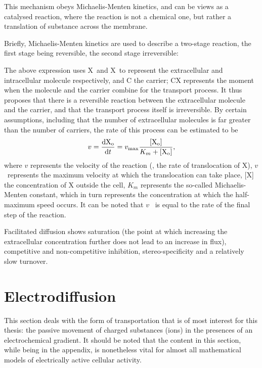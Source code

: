 \documentclass[../thesis-main.tex]{subfiles}
\begin{document}
 This mechanism obeys Michaelis-Menten kinetics, and can be views as a catalysed reaction, where the reaction is not a chemical one, but rather a translation of substance across the membrane.
 
 Briefly, Michaelis-Menten kinetics are used to describe a two-stage reaction, the first stage being reversible, the second stage irreversible:
 \begin{center}
 \end{center}
 The above expression uses X~and X~to represent the extracellular and intracellular molecule respectively, and C the carrier; CX represents the moment when the molecule and the carrier combine for the transport process. It thus proposes that there is a reversible reaction between the extracellular molecule and the carrier, and that the transport process itself is irreversible. By certain assumptions, including that the number of extracellular molecules is far greater than the number of carriers, the rate of this process can be estimated to be
 \begin{equation}
  v = \frac{\textnormal{dX}_\textnormal{o}}{\textnormal{d}t} = v_\textnormal{max}\frac{[\textnormal{X}_\textnormal{o}]}{K_m + [\textnormal{X}_\textnormal{o}]},
 \end{equation}
 where $v$ represents the velocity of the reaction (\idest, the rate of translocation of X), $v$~represents the maximum velocity at which the translocation can take place, [X] the concentration of X outside the cell, $K_m$ represents the so-called Michaelis-Menten constant, which in turn represents the concentration at which the half-maximum speed occurs. It can be noted that $v$~ is equal to the rate of the final step of the reaction.
 
 Facilitated diffusion shows saturation (the point at which increasing the extracellular concentration further does not lead to an increase in flux), competitive and non-competitive inhibition, stereo-specificity and a relatively slow turnover.
 
 \section{Electrodiffusion}
 \label{sec:electrodiffusion}
 This section deals with the form of transportation that is of most interest for this thesis: the passive movement of charged substances (ions) in the presences of an electrochemical gradient. It should be noted that the content in this section, while being in the appendix, is nonetheless vital for almost all mathematical models of electrically active cellular activity.
 
\end{document}
